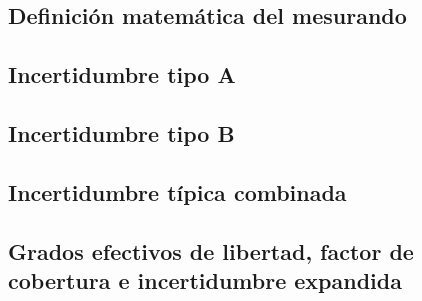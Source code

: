 \subsection{Definición matemática del mesurando}

\subsection{Incertidumbre tipo A}

\subsection{Incertidumbre tipo B}

\subsection{Incertidumbre típica combinada}

\subsection{Grados efectivos de libertad, factor de cobertura e incertidumbre expandida}
